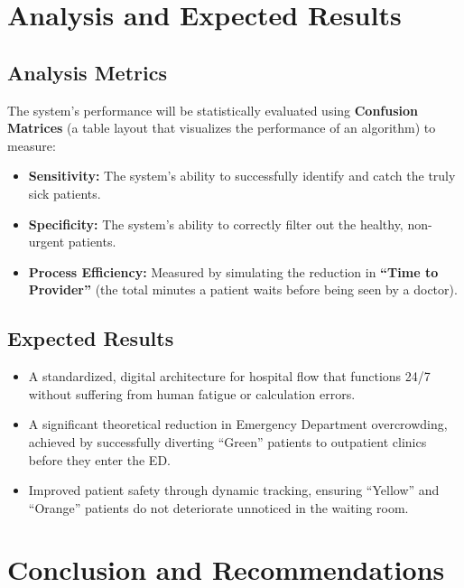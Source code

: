 \documentclass[12pt, a4paper]{article}
\begin{document}
	\section{Analysis and Expected Results}
	\subsection*{Analysis Metrics}
	The system's performance will be statistically evaluated using \textbf{Confusion Matrices} (a table layout that visualizes the performance of an algorithm) to measure:
	\begin{itemize}
		\item \textbf{Sensitivity:} The system's ability to successfully identify and catch the truly sick patients.
		\item \textbf{Specificity:} The system's ability to correctly filter out the healthy, non-urgent patients.
		\item \textbf{Process Efficiency:} Measured by simulating the reduction in \textbf{``Time to Provider''} (the total minutes a patient waits before being seen by a doctor). 
	\end{itemize}
	
	\subsection*{Expected Results}
	\begin{itemize}
		\item A standardized, digital architecture for hospital flow that functions 24/7 without suffering from human fatigue or calculation errors.
		\item A significant theoretical reduction in Emergency Department overcrowding, achieved by successfully diverting ``Green'' patients to outpatient clinics before they enter the ED.
		\item Improved patient safety through dynamic tracking, ensuring ``Yellow'' and ``Orange'' patients do not deteriorate unnoticed in the waiting room.
	\end{itemize}
	
	\section{Conclusion and Recommendations}
\end{document}
